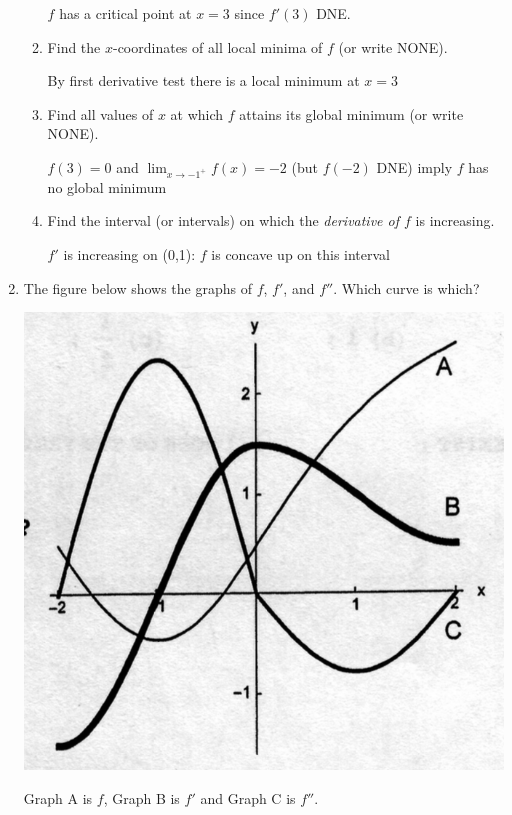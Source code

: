 \documentclass[nooutcomes,handout]{ximera}
\begin{document}
\begin{problem}
\begin{enumerate}
\begin{enumerate}
\begin{freeResponse}
            $f$ has a critical point at $x = 3$ since $f'(3)$ DNE.
          \end{freeResponse}
        \item
          Find the $x$-coordinates of all local minima of $f$ (or write NONE).
        
          \begin{freeResponse} 
           By first derivative test there is a local minimum at $x=3$
          \end{freeResponse}

        \item
          Find all values of $x$ at which $f$ attains its global minimum (or write NONE).
          \begin{freeResponse}
            $f(3) = 0$ and $\lim_{x \to -1^+} f(x) = -2$ (but $f(-2)$ DNE) imply $f$ has no global minimum
          \end{freeResponse}

        \item
          Find the interval (or intervals) on which the \emph{derivative of $f$} is increasing.
          \begin{freeResponse}
            $f'$ is increasing  on (0,1): $f$ is concave up on this interval
          \end{freeResponse}

      \end{enumerate}

    \item
      The figure below shows the graphs of $f$, $f'$, and $f''$.
      Which curve is which?
      \begin{image}
        \includegraphics[scale = 0.3]{figure2.png}
      \end{image}
      \begin{freeResponse}
        Graph A is $f$, Graph B is $f'$ and Graph C is $f''$.
      \end{freeResponse}



\end{enumerate}
\end{problem}
\end{document}
